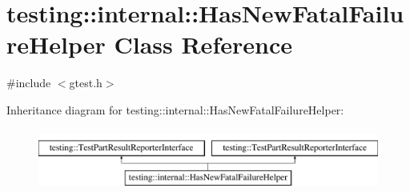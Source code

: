 \hypertarget{classtesting_1_1internal_1_1_has_new_fatal_failure_helper}{\section{testing\-:\-:internal\-:\-:Has\-New\-Fatal\-Failure\-Helper Class Reference}
\label{classtesting_1_1internal_1_1_has_new_fatal_failure_helper}
}


{\ttfamily \#include $<$gtest.\-h$>$}

Inheritance diagram for testing\-:\-:internal\-:\-:Has\-New\-Fatal\-Failure\-Helper\-:\begin{figure}[H]
\begin{center}
\leavevmode
\includegraphics[height=2.000000cm]{classtesting_1_1internal_1_1_has_new_fatal_failure_helper}
\end{center}
\end{figure}
